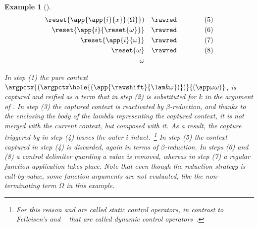 \documentclass{lmcs}
\theoremstyle{defC}
\newtheorem{exaC}[thm]{Example}
\begin{document}
\begin{exaC}[\cite{Biernacki-al:HAL15}]
\[\begin{array}{rcl}
{{{{                           {\reset
                             {\app
                               {\app
                                 {i}
                                 {x}}
                               {\Omega}}})}}}} & \rawred & \quad\quad\quad (5)
                   \\[1mm]
               \reset
                   {\app
                     {i}
                     {\reset
                       {\omega}}} & \rawred & \quad\quad\quad (6)
                   \\[1mm]
               \reset
                   {\app
                     {i}
                     {\omega}} & \rawred & \quad\quad\quad (7)
                   \\[1mm]
               \reset
                   {\omega} & \rawred & \quad\quad\quad (8)
                   \\[1mm]
               \omega & &
     \end{array}
     \]

     \vspace{2mm}\noindent In step (1) the pure context $\argpctx{(\argpctx
       \hole {(\app {\rawshift} {\lam k \omega})})} {(\app \omega \omega)}$, is
     captured and reified as a term that in step (2) is substituted for $k$ in
     the argument of \textshift{}. In step (3) the captured context is
     reactivated by $\beta$-reduction, and thanks to the \textreset{} enclosing
     the body of the lambda representing the captured context, it is not
     \emph{merged} with the current context, but \emph{composed} with it. As a
     result, the capture triggered by \textshift{} in step (4) leaves the outer
     $i$ intact.~\footnote{For this reason \textshift{} and \textreset{} are
       called \textit{static} control operators, in contrast to Felleisen's
       \textcontrol{} and \textprompt{}~\cite{Felleisen:POPL88} that are called
                   \textit{dynamic} control operators~\cite{Biernacki-al:SCP06}.}
     In step (5) the context captured in step (4) is discarded, again in terms
     of $\beta$-reduction. In steps (6) and (8) a control delimiter guarding a
     value is removed, whereas in step (7) a regular function application takes
     place.  Note that even though the reduction strategy is call-by-value, some
     function arguments are not evaluated, like the non-terminating term
     $\Omega$ in this example.
\end{exaC}
\end{document}
